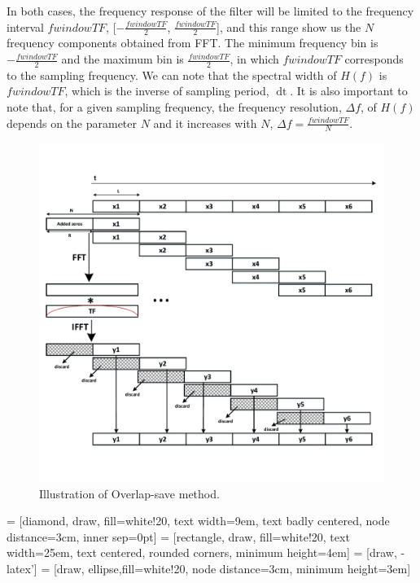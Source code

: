 In both cases, the frequency response of the filter will be limited to the frequency interval $fwindowTF$, [$-\frac{fwindowTF}{2}$, $\frac{fwindowTF}{2}$], and this range show us the $N$ frequency components obtained from FFT. The minimum frequency bin is $-\frac{fwindowTF}{2}$ and the maximum bin is $\frac{fwindowTF}{2}$, in which $fwindowTF$ corresponds to the sampling frequency. We can note that the spectral width of $H(f)$ is $fwindowTF$, which is the inverse of sampling period, $\mathop{dt}$. It is also important to note that, for a given sampling frequency, the frequency resolution, $\Delta f$, of $H(f)$ depends on the parameter $N$ and it increases with $N$, $\Delta f=\frac{fwindowTF}{N}$.
\begin{figure}[h]
    \centering
    \includegraphics[width=15cm]{./algorithms/overlap_save/figures/overlap-savev2.pdf}
    \caption{Illustration of Overlap-save method.}
    \label{overlapSave}
\end{figure}

\newpage

 = [diamond, draw, fill=white!20, 
text width=9em, text badly centered, node distance=3cm, inner sep=0pt]
 = [rectangle, draw, fill=white!20, 
text width=25em, text centered, rounded corners, minimum height=4em]
 = [draw, -latex']
 = [draw, ellipse,fill=white!20, node distance=3cm,
minimum height=3em]

